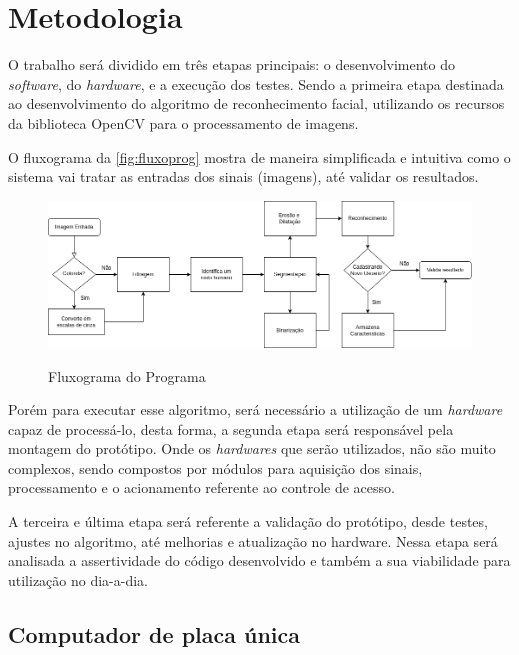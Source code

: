 
\chapter{Metodologia}\label{cap:materialemetodos}

O trabalho será dividido em três etapas principais: o desenvolvimento do \textit{software}, 
do \textit{hardware}, e a execução dos testes. Sendo a primeira etapa 
destinada ao desenvolvimento do algoritmo de reconhecimento facial, utilizando os 
recursos da biblioteca OpenCV para o processamento de imagens.

O fluxograma da \autoref{fig:fluxoprog} mostra de maneira simplificada e intuitiva
como o sistema vai tratar as entradas dos sinais (imagens), até validar os resultados.

\begin{figure}[h!]
    \centering
    \caption{Fluxograma do Programa}
    \includegraphics[scale=0.4]{figuras/fluxo_programa.png} 
    \fonte{}%
    \label{fig:fluxoprog}
    \centering
\end{figure}

Porém para executar esse algoritmo, será necessário a utilização de um \textit{hardware} 
capaz de processá-lo, desta forma, a segunda etapa será responsável pela montagem 
do protótipo. Onde os \textit{hardwares} que serão utilizados, não são muito complexos, 
sendo compostos por módulos para aquisição dos sinais, processamento e o acionamento 
referente ao controle de acesso.

A terceira e última etapa será referente a validação do protótipo, desde testes, 
ajustes no algoritmo, até melhorias e atualização no hardware. Nessa etapa será 
analisada a assertividade do código desenvolvido e também a sua viabilidade para
utilização no dia-a-dia.

\section{Computador de placa única}\label{sec:materiais}

